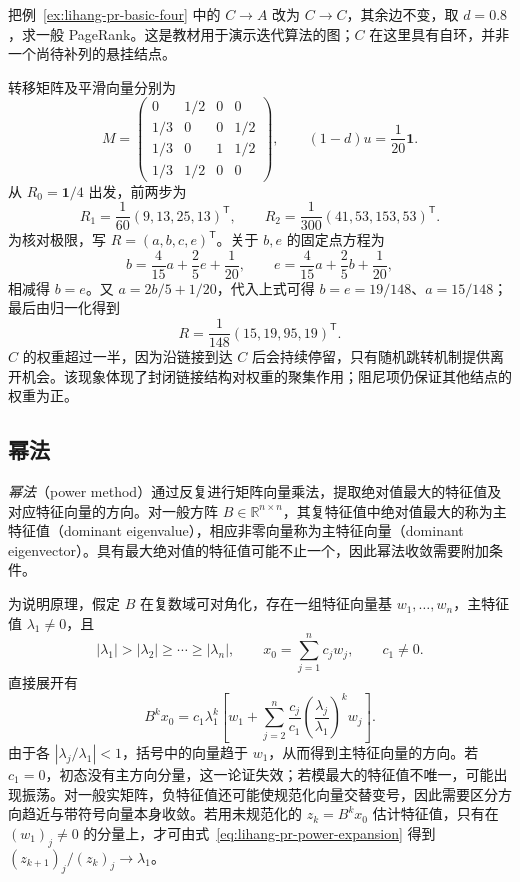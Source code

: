 \begin{example}
\label{ex:lihang-pr-self-loop}
把例~\ref{ex:lihang-pr-basic-four} 中的 $C\to A$ 改为 $C\to C$，其余边不变，取 $d=0.8$，求一般 PageRank。这是教材用于演示迭代算法的图；$C$ 在这里具有自环，并非一个尚待补列的悬挂结点。
\end{example}

\begin{solve}
转移矩阵及平滑向量分别为
\[
    M=\begin{pmatrix}
        0&1/2&0&0\\
        1/3&0&0&1/2\\
        1/3&0&1&1/2\\
        1/3&1/2&0&0
    \end{pmatrix},\qquad (1-d)u=\frac1{20}\boldsymbol1.
\]
从 $R_0=\boldsymbol1/4$ 出发，前两步为
\[
    R_1=\frac1{60}(9,13,25,13)^{\mathsf T},\qquad
    R_2=\frac1{300}(41,53,153,53)^{\mathsf T}.
\]
为核对极限，写 $R=(a,b,c,e)^{\mathsf T}$。关于 $b,e$ 的固定点方程为
\[
    b=\frac4{15}a+\frac25e+\frac1{20},\qquad
    e=\frac4{15}a+\frac25b+\frac1{20},
\]
相减得 $b=e$。又 $a=2b/5+1/20$，代入上式可得 $b=e=19/148$、$a=15/148$；最后由归一化得到
\begin{equation}
\label{eq:lihang-pr-self-loop-result}
    R=\frac1{148}(15,19,95,19)^{\mathsf T}.
\end{equation}
$C$ 的权重超过一半，因为沿链接到达 $C$ 后会持续停留，只有随机跳转机制提供离开机会。该现象体现了封闭链接结构对权重的聚集作用；阻尼项仍保证其他结点的权重为正。
\end{solve}

\subsection{幂法}
\label{subsec:lihang-pr-power-method}

\emph{幂法}（power method）通过反复进行矩阵向量乘法，提取绝对值最大的特征值及对应特征向量的方向。对一般方阵 $B\in\mathbb R^{n\times n}$，其复特征值中绝对值最大的称为主特征值（dominant eigenvalue），相应非零向量称为主特征向量（dominant eigenvector）。具有最大绝对值的特征值可能不止一个，因此幂法收敛需要附加条件。

为说明原理，假定 $B$ 在复数域可对角化，存在一组特征向量基 $w_1,\ldots,w_n$，主特征值 $\lambda_1\neq0$，且
\[
    |\lambda_1|>|\lambda_2|\geq\cdots\geq|\lambda_n|,\qquad
    x_0=\sum_{j=1}^{n}c_jw_j,\qquad c_1\neq0.
\]
直接展开有
\begin{equation}
\label{eq:lihang-pr-power-expansion}
    B^kx_0=c_1\lambda_1^k\left[
        w_1+\sum_{j=2}^{n}\frac{c_j}{c_1}
        \left(\frac{\lambda_j}{\lambda_1}\right)^kw_j
    \right].
\end{equation}
由于各 $|\lambda_j/\lambda_1|<1$，括号中的向量趋于 $w_1$，从而得到主特征向量的方向。若 $c_1=0$，初态没有主方向分量，这一论证失效；若模最大的特征值不唯一，可能出现振荡。对一般实矩阵，负特征值还可能使规范化向量交替变号，因此需要区分方向趋近与带符号向量本身收敛。若用未规范化的 $z_k=B^kx_0$ 估计特征值，只有在 $(w_1)_j\neq0$ 的分量上，才可由式~\eqref{eq:lihang-pr-power-expansion} 得到 $(z_{k+1})_j/(z_k)_j\to\lambda_1$。

